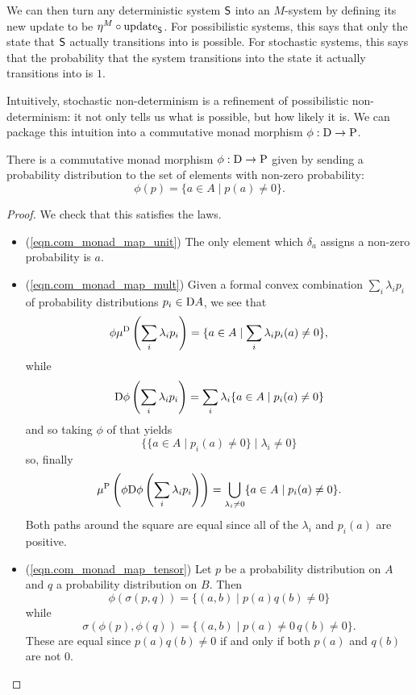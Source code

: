 \documentclass[DynamicalBook]{subfiles}
\begin{document}
We can then turn any deterministic system $\mathsf{S}$ into an $M$-system by
defining its new update to be $\eta^M \circ \mathrm{update}_{\mathsf{S}}$. For possibilistic
systems, this says that only the state that $\mathsf{S}$ actually transitions into
is possible. For stochastic systems, this says that the probability that the
system transitions into the state it actually transitions into is $1$.

Intuitively, stochastic non-determinism is a refinement of possibilistic
non-determinism: it not only tells us what is possible, but how likely it is. We
can package this intuition into a commutative monad morphism $\phi : \mathrm{D}
\to \mathrm{P}$.
\begin{proposition}
  There is a commutative monad morphism $\phi : \mathrm{D} \to \mathrm{P}$ given by
  sending a probability distribution to the set of elements with non-zero probability:
  \[
\phi(p) = \{a \in A \mid p(a) \neq 0\}.
  \]
\end{proposition}
\begin{proof}
  We check that this satisfies the laws.
  \begin{itemize}
    \item (\cref{eqn.com_monad_map_unit}) The only element which $\delta_a$
      assigns a non-zero probability is $a$.
    \item (\cref{eqn.com_monad_map_mult}) Given a formal convex combination
      $\sum_i \lambda_i p_i$ of probability distributions $p_i \in \mathrm{D} A$,
      we see that
      \[
\phi\mu^{\mathrm{D}}\left( \sum_{i}\lambda_i p_i \right) = \{a \in A \mid \sum_i
\lambda_i p_i(a) \neq 0\},
      \]
      while
      \[
\mathrm{D}\phi\left( \sum_i \lambda_i p_i \right) = \sum_{i} \lambda_i \{a \in A
\mid p_i(a) \neq 0\}
\]
and so taking $\phi$ of that yields
\[
\{\{a \in A \mid p_i(a) \neq 0\} \mid \lambda_i \neq 0\}
\]
so, finally
\[
\mu^{\mathrm{P}}\left( \phi \mathrm{D} \phi\left( \sum_i \lambda_i p_i \right) \right)
= \bigcup_{\lambda_i \neq 0} \{a \in A \mid p_i(a) \neq 0\}.
\]
Both paths around the square are equal since all of the $\lambda_i$ and $p_i(a)$ are positive.
\item (\cref{eqn.com_monad_map_tensor}) Let $p$ be a probability distribution on
  $A$ and $q$ a probability distribution on $B$. Then
  \[
\phi(\sigma(p, q)) = \{(a, b) \mid p(a)q(b) \neq 0\}
\]
while
\[
\sigma(\phi(p), \phi(q)) = \{(a, b) \mid p(a) \neq 0\, q(b) \neq 0\}.
\]
These are equal since $p(a)q(b) \neq 0$ if and only if both $p(a)$ and $q(b)$
are not $0$.
  \end{itemize}
\end{proof}
\end{document}
